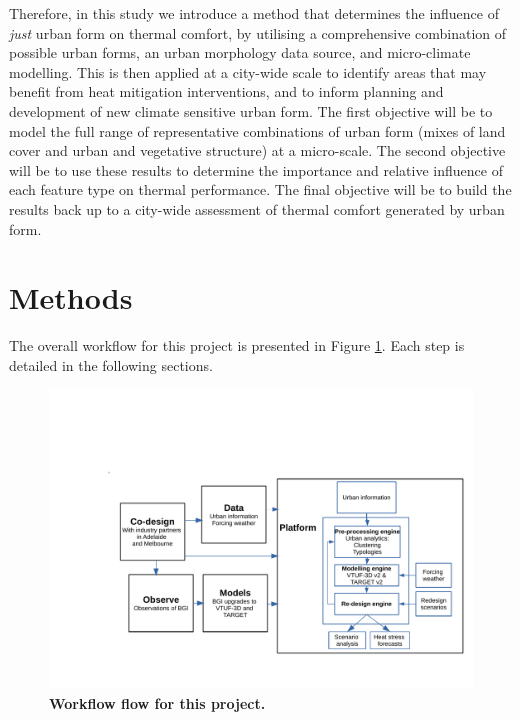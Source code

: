 \documentclass[final,3p,times,authoryear]{elsarticle}
\begin{document}
Therefore, in this study we introduce a method that determines the influence of \textit{just} urban form on thermal comfort, by utilising a comprehensive combination of possible urban forms, an urban morphology data source, and micro-climate modelling. This is then applied at a city-wide scale to identify areas that may benefit from heat mitigation interventions, and to inform planning and development of new climate sensitive urban form. The first objective will be to model the full range of representative combinations of urban form (mixes of land cover and urban and vegetative structure) at a micro-scale. The second objective will be to use these results to determine the importance and relative influence of each feature type on thermal performance. The final objective will be to build the results back up to a city-wide assessment of thermal comfort generated by urban form.

\section{Methods}\label{sec:methods}

The overall workflow for this project is presented in Figure \ref{fig:process}. Each step is detailed in the following sections.


\begin{figure}[ht]
\centering
\includegraphics[page=2,trim={46 280 100 10},clip,scale=0.45]{Figures/Processes.pdf}
\caption{\bf Workflow flow for this project.}
 \label{fig:process}
\end{figure} 

\end{document}
